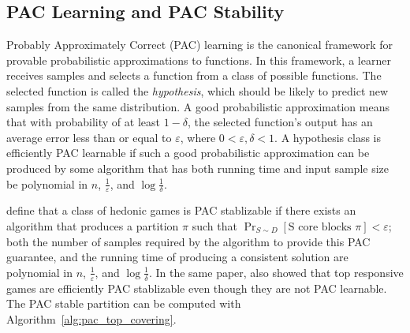 \subsection{PAC Learning and PAC Stability}
Probably Approximately Correct (PAC) learning is the canonical framework for provable probabilistic approximations to functions. In this framework, a learner receives samples and selects a function from a class of possible functions. The selected function is called the \textit{hypothesis}, which should be likely to predict new samples from the same distribution. A good probabilistic approximation means that with probability of at least $1 - \delta$, the selected function's output has an average error less than or equal to $\varepsilon$, where $0 < \varepsilon, \delta < 1$. A hypothesis class is efficiently PAC learnable if such a good probabilistic approximation can be produced by some algorithm that has both running time and input sample size be polynomial in $n$, $\frac{1}{\varepsilon}$, and $\log{\frac{1}{\delta}}$.

 define that a class of hedonic games is PAC stablizable if there exists an algorithm that produces a partition $\pi$ such that $\Pr_{S\sim D}[\text{S core blocks } \pi] < \varepsilon$; both the number of samples required by the algorithm to provide this PAC guarantee, and the running time of producing a consistent solution are polynomial in $n$, $\frac{1}{\varepsilon}$, and $\log{\frac{1}{\delta}}$. In the same paper,  also showed that top responsive games are efficiently PAC stablizable even though they are not PAC learnable. The PAC stable partition can be computed with Algorithm~\ref{alg:pac_top_covering}.

